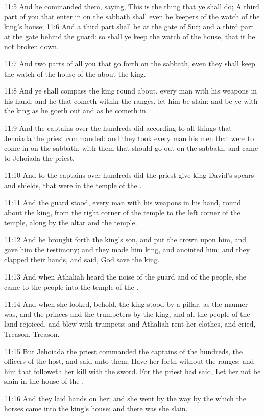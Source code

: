 11:5 And he commanded them, saying, This is the thing that ye shall do; A third part of you that enter in on the sabbath shall even be keepers of the watch of the king's house; 11:6 And a third part shall be at the gate of Sur; and a third part at the gate behind the guard: so shall ye keep the watch of the house, that it be not broken down.

11:7 And two parts of all you that go forth on the sabbath, even they shall keep the watch of the house of the \LORD about the king.

11:8 And ye shall compass the king round about, every man with his weapons in his hand: and he that cometh within the ranges, let him be slain: and be ye with the king as he goeth out and as he cometh in.

11:9 And the captains over the hundreds did according to all things that Jehoiada the priest commanded: and they took every man his men that were to come in on the sabbath, with them that should go out on the sabbath, and came to Jehoiada the priest.

11:10 And to the captains over hundreds did the priest give king David's spears and shields, that were in the temple of the \LORD.

11:11 And the guard stood, every man with his weapons in his hand, round about the king, from the right corner of the temple to the left corner of the temple, along by the altar and the temple.

11:12 And he brought forth the king's son, and put the crown upon him, and gave him the testimony; and they made him king, and anointed him; and they clapped their hands, and said, God save the king.

11:13 And when Athaliah heard the noise of the guard and of the people, she came to the people into the temple of the \LORD.

11:14 And when she looked, behold, the king stood by a pillar, as the manner was, and the princes and the trumpeters by the king, and all the people of the land rejoiced, and blew with trumpets: and Athaliah rent her clothes, and cried, Treason, Treason.

11:15 But Jehoiada the priest commanded the captains of the hundreds, the officers of the host, and said unto them, Have her forth without the ranges: and him that followeth her kill with the sword. For the priest had said, Let her not be slain in the house of the \LORD.

11:16 And they laid hands on her; and she went by the way by the which the horses came into the king's house: and there was she slain.

